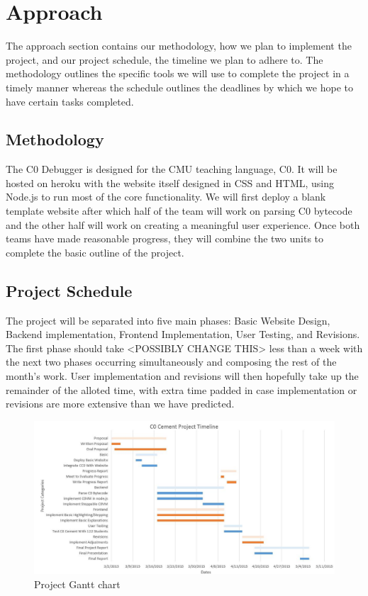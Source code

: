 \documentclass[11pt]{article}
\begin{document}
\section{Approach}
\par
The approach section contains our methodology, how we plan to implement the
project, and our project schedule, the timeline we plan to adhere to.  The
methodology outlines the specific tools we will use to complete the project in
a timely manner whereas the schedule outlines the deadlines by which we hope to
have certain tasks completed.

\subsection{Methodology}
The C0 Debugger is designed for the CMU teaching language, C0.  It will be
hosted on heroku with the website itself designed in CSS and HTML, using
Node.js to run most of the core functionality.  We will first deploy a blank
template website after which half of the team will work on parsing C0 bytecode
and the other half will work on creating a meaningful user experience.  Once
both teams have made reasonable progress, they will combine the two units to
complete the basic outline of the project.

\subsection{Project Schedule}
The project will be separated into five main phases: Basic Website Design,
Backend implementation, Frontend Implementation, User Testing, and Revisions.
The first phase should take <POSSIBLY CHANGE THIS> less than a week with the
next two phases occurring simultaneously and composing the rest of the month's
work.  User implementation and revisions will then hopefully take up the
remainder of the alloted time, with extra time padded in case implementation or
revisions are more extensive than we have predicted.
\begin{figure}[h]
  \centering
  \includegraphics[width=\linewidth]{gantt.jpg}
  \caption{Project Gantt chart}
  \label{fig:gantt}
\end{figure}
\end{document}
